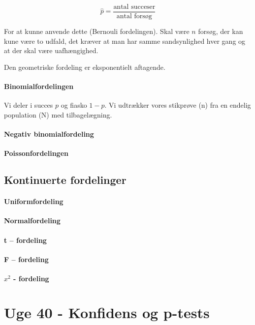 \documentclass{article}
\begin{document}
$$\hat{p} = \frac{\text{antal succeser}}{\text{antal forsøg}}$$

For at kunne anvende dette (Bernouli fordelingen). Skal være $n$ forsøg, der kan
kune være to udfald, det kræver at man har samme sandsynlighed hver gang og at
der skal være uafhængighed. 

Den geometriske fordeling er eksponentielt aftagende.
\paragraph{Binomialfordelingen}
Vi deler i succes $p$ og fiasko $1-p$. Vi udtrækker vores stikprøve (n) fra en
endelig population (N) med tilbagelægning.


\paragraph{Negativ binomialfordeling}
\paragraph{Poissonfordelingen}

\subsection{Kontinuerte fordelinger}
\paragraph{Uniformfordeling}
\paragraph{Normalfordeling}
\paragraph{t – fordeling}
\paragraph{F – fordeling}
\paragraph{$x^2$  - fordeling}

\newpage

\section{Uge 40 - Konfidens og p-tests}
\end{document}
